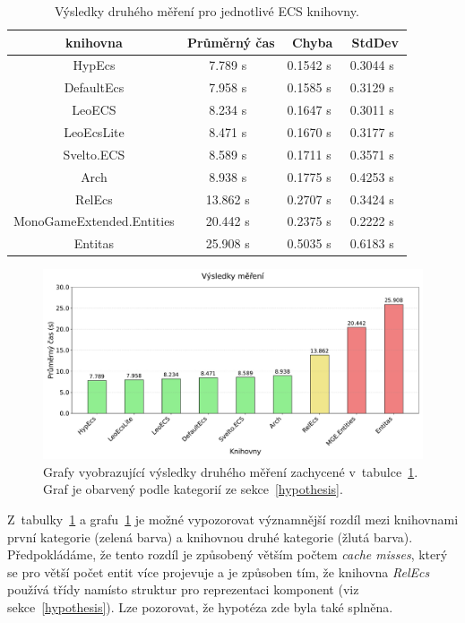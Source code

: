 \begin{table}[!htb]
    \centering\footnotesize\sf
    \begin{tabular}{c c c c}
        \toprule
        knihovna & Průměrný čas & Chyba & StdDev \\
        \midrule
        HypEcs & 7.789 s~& 0.1542 s~& 0.3044 s~\\
        DefaultEcs & 7.958 s~& 0.1585 s~& 0.3129 s~\\
        LeoECS & 8.234 s~& 0.1647 s~& 0.3011 s~\\
        LeoEcsLite & 8.471 s~& 0.1670 s~& 0.3177 s~\\
        Svelto.ECS & 8.589 s~& 0.1711 s~& 0.3571 s~\\
        Arch & 8.938 s~& 0.1775 s~& 0.4253 s~\\
        RelEcs & 13.862 s~& 0.2707 s~& 0.3424 s~\\
        MonoGameExtended.Entities & 20.442 s~& 0.2375 s~& 0.2222 s~\\
        Entitas & 25.908 s~& 0.5035 s~& 0.6183 s~\\
        \bottomrule
    \end{tabular}
    \caption{Výsledky druhého měření pro jednotlivé ECS knihovny.}
    \label{tab:second-benchmark-results}
\end{table}

\begin{figure}[!htb]
    \centering
    \includegraphics[width=1.0\linewidth]{plots/second_benchmark_results.pdf}
    \caption{Grafy vyobrazující výsledky druhého měření zachycené v~tabulce~\ref{tab:second-benchmark-results}. Graf je obarvený podle kategorií ze sekce~\ref{hypothesis}.}
    \label{fig:second-benchmark-results}
\end{figure}

Z~tabulky~\ref{tab:second-benchmark-results} a grafu~\ref{fig:second-benchmark-results} je možné vypozorovat významnější rozdíl mezi knihovnami první kategorie (zelená barva) a knihovnou druhé kategorie (žlutá barva). Předpokládáme, že tento rozdíl je způsobený větším počtem \textit{cache misses}, který se pro větší počet entit více projevuje a je způsoben tím, že knihovna \textit{RelEcs} používá třídy namísto struktur pro reprezentaci komponent (viz sekce~\ref{hypothesis}). Lze pozorovat, že hypotéza zde byla také splněna.

